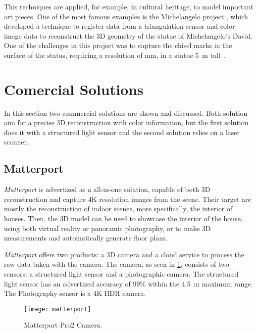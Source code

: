 This techniques are applied, for example, in cultural heritage, to model important art pieces. One of the most famous examples is the Michelangelo project \cite{levoy2000}, which developed a technique to register data from a triangulation sensor and color image data to reconstruct the 3D geometry of the statue of Michelangelo's David. One of the challenges in this project was to capture the chisel marks in the surface of the status, requiring a resolution of  \si{\milli\meter}, in a statue \SI{5}{\meter} tall~\cite{levoy2000}.

\section{Comercial Solutions}

In this section two commercial solutions are shown and discussed. Both solution aim for a precise 3D reconstruction with color information, but the first solution does it with a structured light sensor and the second solution relies on a laser scanner. 

\subsection{Matterport}

\emph{Matterport} is advertized as a all-in-one solution, capable of both 3D reconstruction and capture 4K resolution images from the scene. Their target are mostly the reconstruction of indoor scenes, more specifically, the interior of houses. Then, the 3D model can be used to showcase the interior of the house, using both virtual reality or panoramic photography, or to make 3D measurements and automatically generate floor plans\cite{matterport}.

\emph{Matterport} offers two products: a 3D camera and a cloud service to process the raw data taken with the camera. The camera, as seen in \cref{fig:matterport-camera}, consists of two sensors: a structured light sensor and a photographic camera\cite{matterport}. The structured light sensor has an advertized accuracy of $99\%$ within the \SI{4.5}{\meter} maximum range. The Photography sensor is a 4K HDR camera.

\begin{figure}[h]
    
    \centering
    \texttt{[image: matterport]}

    \caption{Matterport Pro2 Camera.}
    \label{fig:matterport-camera}

\end{figure}

